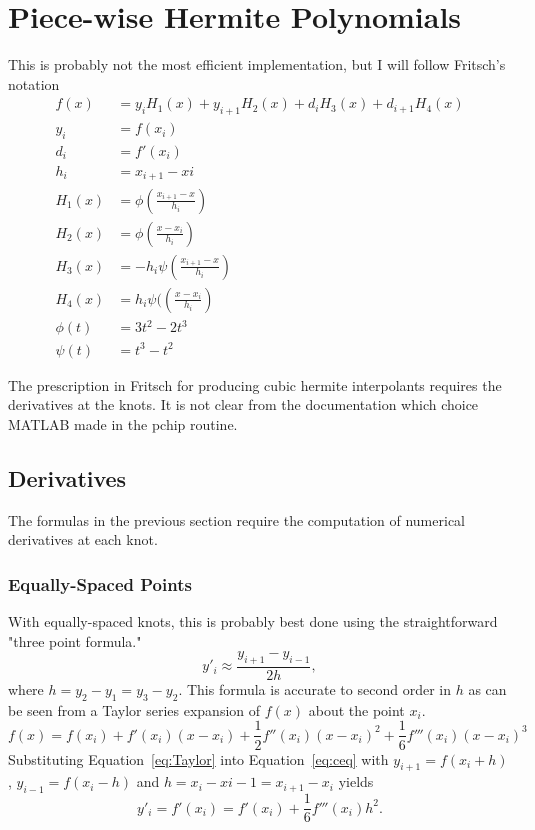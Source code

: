 \documentclass{scrartcl}
\begin{document}
\section{Piece-wise Hermite Polynomials}
This is probably not the most efficient implementation, but
I will follow Fritsch's notation\cite{Fritsch}
\begin{align}
f(x) &= y_i H_1(x) + y_{i+1} H_2(x) + d_i H_3(x) + d_{i+1} H_4(x)\\
y_i &= f(x_i)\\
d_i &= f'(x_i)\\
h_i &= x_{i+1}-x{i}\\
H_1(x) &= \phi\left(\frac{x_{i+1}-x}{h_i}\right)\\
H_2(x) &= \phi\left(\frac{x-x_i}{h_i}\right)\\
H_3(x) &= -h_i\psi\left(\frac{x_{i+1}-x}{h_i}\right)\\
H_4(x) &= h_i\psi(\left(\frac{x-x_i}{h_i}\right)\\
\phi(t) &= 3t^2-2t^3\\
\psi(t) &= t^3-t^2
\end{align}

The prescription in Fritsch\cite{Fritsch} for producing cubic
hermite interpolants requires the derivatives at the knots. It
is not clear from the documentation which choice MATLAB
made in the pchip routine.
\subsection{Derivatives}
The formulas in the previous section require the computation of
numerical derivatives at each knot.
\subsubsection{Equally-Spaced Points}
With equally-spaced knots, this
is probably best done using the straightforward "three point formula."
\begin{equation}
y'_i \approx \frac{y_{i+1}-y_{i-1}}{2h},\label{eq:ceq}
\end{equation}
where $h=y_2-y_1=y_3-y_2$.
This formula is accurate to second order in $h$ as can be seen
from a Taylor series expansion of $f(x)$ about the point $x_i$.
\begin{equation}
f(x)=f(x_i)+f'(x_i)(x-x_i)+\frac{1}{2}f''(x_i)(x-x_i)^2+
	\frac{1}{6}f'''(x_i)(x-x_i)^3\label{eq:Taylor}
\end{equation}
Substituting Equation~\ref{eq:Taylor} into Equation~\ref{eq:ceq}
with $y_{i+1}=f(x_i+h)$, $y_{i-1}=f(x_i-h)$ and
$h=x_i-x{i-1}=x_{i+1}-x_i$ yields
\begin{equation}
y'_i=f'(x_i)=f'(x_i)+\frac{1}{6}f'''(x_i)h^2.
\end{equation}
\end{document}
